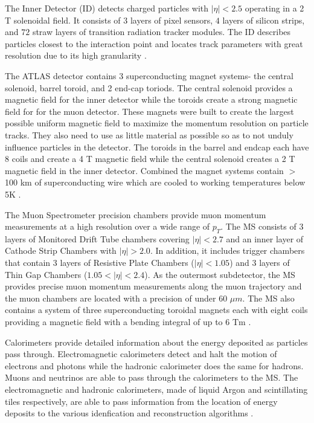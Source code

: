 The Inner Detector (ID) detects charged particles with $|\eta| < 2.5$ operating in a 2 T solenoidal field. It consists of $3$ layers of pixel sensors, $4$ layers of silicon strips, and $72$ straw layers of transition radiation tracker modules. The ID describes particles closest to the interaction point and locates track parameters with great resolution due to its high granularity \cite{detector}. 

The ATLAS detector contains 3 superconducting magnet systems- the central solenoid, barrel toroid, and 2 end-cap toriods. The central solenoid provides a magnetic field for the inner detector while the toroids create a strong magnetic field for for the muon detector. These magnets were built to create the largest possible uniform magnetic field to maximize the momentum resolution on particle tracks. They also need to use as little material as possible so as to not unduly influence particles in the detector. The toroids in the barrel and endcap each have 8 coils and create a 4 T magnetic field while the central solenoid creates a 2 T magnetic field in the inner detector. Combined the magnet systems contain $>$100 km of superconducting wire which are cooled to working temperatures below 5K \cite{detector}. 

The Muon Spectrometer precision chambers provide muon momentum measurements at a high resolution over a wide range of $p_T$. The MS consists of $3$ layers of Monitored Drift Tube chambers covering $|\eta| < 2.7$ and an inner layer of Cathode Strip Chambers with $|\eta| > 2.0$. In addition, it includes trigger chambers that contain $3$ layers of Resistive Plate Chambers ($|\eta| < 1.05$) and $3$ layers of Thin Gap Chambers ($1.05 < |\eta| < 2.4$). As the outermost subdetector, the MS provides precise muon momentum measurements along the muon trajectory and the muon chambers are located with a precision of under $60$ $\mu m$. The MS also contains a system of three superconducting toroidal magnets each with eight coils providing a magnetic field with a bending integral of up to $6$ Tm \cite{detector}. 

Calorimeters provide detailed information about the energy deposited as particles pass through. Electromagnetic calorimeters detect and halt the motion of electrons and photons while the hadronic calorimeter does the same for hadrons. Muons and neutrinos are able to pass through the calorimeters to the MS. The electromagnetic and hadronic calorimeters, made of liquid Argon and scintillating tiles respectively, are able to pass information from the location of energy deposits to the various idenfication and reconstruction algorithms \cite{detector}. 

